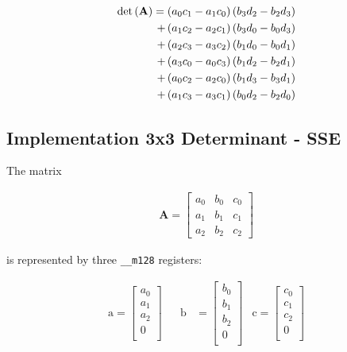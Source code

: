 \begin{align}
\mathrm{det}\left(\mathbf{A}\right)
= \left(a_0c_1 - a_1c_0\right) \left(b_3d_2 - b_2d_3\right) \nonumber\\
+ \left(a_1c_2 - a_2c_1\right) \left(b_3d_0 - b_0d_3\right) \nonumber\\ 
+ \left(a_2c_3 - a_3c_2\right) \left(b_1d_0 - b_0d_1\right) \nonumber\\
+ \left(a_3c_0 - a_0c_3\right) \left(b_1d_2 - b_2d_1\right) \nonumber\\
+ \left(a_0c_2 - a_2c_0\right) \left(b_1d_3 - b_3d_1\right) \nonumber\\
+ \left(a_1c_3 - a_3c_1\right) \left(b_0d_2 - b_2d_0\right) \label{eq:determinant4x4AVX}
\end{align}


\newpage
\subsection{Implementation 3x3 Determinant - SSE}
\label{sec:determinant3x3SSE}

The matrix

\begin{align*}
\mathbf{A}
=
\begin{bmatrix}
a_0&b_0&c_0\\
a_1&b_1&c_1\\
a_2&b_2&c_2
\end{bmatrix}
\end{align*}

is represented by three \texttt{__m128} registers:

\begin{align*}
\mathrm{a} 
=
\begin{bmatrix}
a_0\\
a_1\\
a_2\\
0\\
\end{bmatrix}
&&
\mathrm{b} 
&=
\begin{bmatrix}
b_0\\
b_1\\
b_2\\
0\\
\end{bmatrix}
&
\mathrm{c} 
=
\begin{bmatrix}
c_0\\
c_1\\
c_2\\
0\\
\end{bmatrix}
\end{align*}

